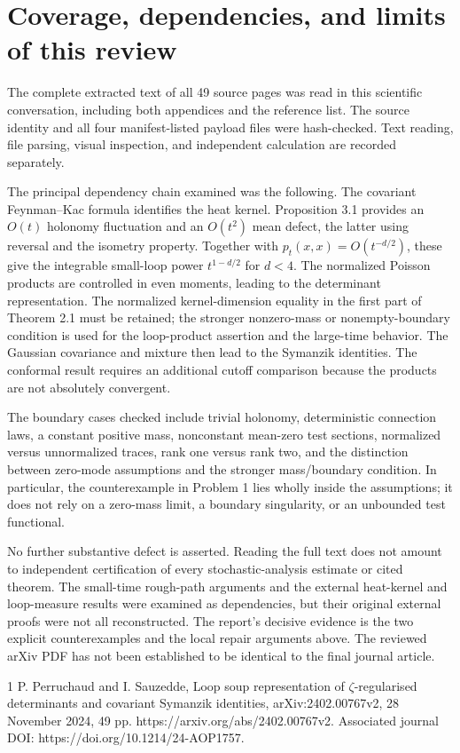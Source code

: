 \documentclass[10pt]{article}
\begin{document}
\section*{Coverage, dependencies, and limits of this review}
The complete extracted text of all 49 source pages was read in this scientific conversation, including both appendices and the reference list. The source identity and all four manifest-listed payload files were hash-checked. Text reading, file parsing, visual inspection, and independent calculation are recorded separately.\par
The principal dependency chain examined was the following. The covariant Feynman–Kac formula identifies the heat kernel. Proposition 3.1 provides an \(O(t)\) holonomy fluctuation and an \(O(t^2)\) mean defect, the latter using reversal and the isometry property. Together with \(p_t(x,x)=O(t^{-d/2})\), these give the integrable small-loop power \(t^{1-d/2}\) for \(d<4\). The normalized Poisson products are controlled in even moments, leading to the determinant representation. The normalized kernel-dimension equality in the first part of Theorem 2.1 must be retained; the stronger nonzero-mass or nonempty-boundary condition is used for the loop-product assertion and the large-time behavior. The Gaussian covariance and mixture then lead to the Symanzik identities. The conformal result requires an additional cutoff comparison because the products are not absolutely convergent.\par
The boundary cases checked include trivial holonomy, deterministic connection laws, a constant positive mass, nonconstant mean-zero test sections, normalized versus unnormalized traces, rank one versus rank two, and the distinction between zero-mode assumptions and the stronger mass/boundary condition. In particular, the counterexample in Problem 1 lies wholly inside the assumptions; it does not rely on a zero-mass limit, a boundary singularity, or an unbounded test functional.\par
No further substantive defect is asserted. Reading the full text does not amount to independent certification of every stochastic-analysis estimate or cited theorem. The small-time rough-path arguments and the external heat-kernel and loop-measure results were examined as dependencies, but their original external proofs were not all reconstructed. The report’s decisive evidence is the two explicit counterexamples and the local repair arguments above. The reviewed arXiv PDF has not been established to be identical to the final journal article.\par
1 P. Perruchaud and I. Sauzedde, Loop soup representation of \(\zeta\)-regularised determinants and covariant Symanzik identities, arXiv:2402.00767v2, 28 November 2024, 49 pp. https://arxiv.org/abs/2402.00767v2. Associated journal DOI: https://doi.org/10.1214/24-AOP1757.\par
\end{document}
